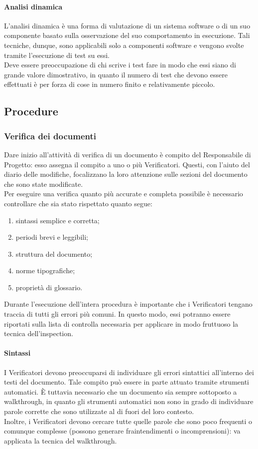 			\paragraph{Analisi dinamica}
				L'analisi dinamica è una forma di valutazione di un sistema software o di un suo componente basato sulla osservazione del suo 
				comportamento in esecuzione. Tali tecniche, dunque, sono applicabili solo a componenti software e vengono svolte tramite l'esecuzione 
				di test su essi.\\
				Deve essere preoccupazione di chi scrive i test fare in modo che essi siano di grande valore dimostrativo, in quanto il numero di test 
				che devono essere effettuati è per forza di cose in numero finito e relativamente piccolo.
	\subsection{Procedure}
		\subsubsection{Verifica dei documenti}
			Dare inizio all'attività di verifica di un documento è compito del Responsabile di Progetto: esso assegna il compito a uno o più Verificatori. 
			Questi, con l'aiuto del diario delle modifiche, focalizzano la loro attenzione sulle sezioni del documento che sono state modificate.\\
			Per eseguire una verifica quanto più accurate e completa possibile è necessario controllare che sia stato rispettato quanto segue:
			\begin{enumerate}
				\item sintassi semplice e corretta;
				\item periodi brevi e leggibili;
				\item struttura del documento;
				\item norme tipografiche;
				\item proprietà di glossario.
			\end{enumerate}
			Durante l'esecuzione dell'intera procedura è importante che i Verificatori tengano traccia di tutti gli errori più comuni. In questo modo, 
			essi potranno essere riportati sulla lista di controlla necessaria per applicare in modo fruttuoso la tecnica dell'inspection.
			\paragraph{Sintassi}
				I Verificatori devono preoccuparsi di individuare gli errori sintattici all'interno dei testi del documento. Tale compito può essere in 
				parte attuato tramite strumenti automatici. È tuttavia necessario che un documento sia sempre sottoposto a walkthrough, in quanto gli 
				strumenti automatici non sono in grado di individuare parole corrette che sono utilizzate al di fuori del loro contesto.\\
				Inoltre, i Verificatori devono cercare tutte quelle parole che sono poco frequenti o comunque complesse (possono generare fraintendimenti 
				o incomprensioni): va applicata la tecnica del walkthrough.
